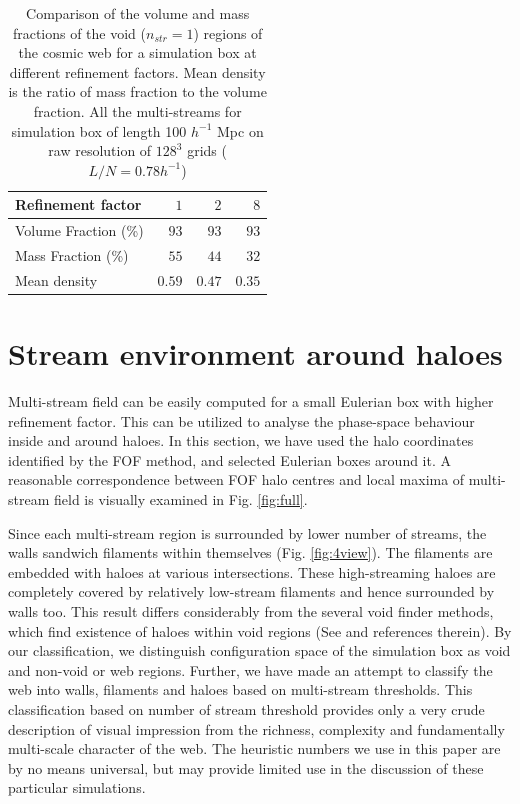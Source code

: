 \begin{table}
 \centering
  \caption{Comparison of the volume and mass fractions of the void ($n_{str} = 1$) regions of the cosmic web for a simulation box at different refinement factors. Mean density is the ratio of mass fraction to the volume fraction. All the multi-streams for simulation box of length 100 $h^{-1}$ Mpc on raw resolution of $128^{3}$ grids ($ L/N = 0.78 h^{-1}$) }
\begin{tabular}{|l|r|r|r|}
\hline
Refinement factor               & $1$ & $2$& $8$   \\ \hline
Volume Fraction (\%)                 & $93$   & $93$    & $93$       \\ \hline
Mass Fraction   (\%)               & $55$   & $44$   & $32$           \\ \hline
Mean density                    & $0.59$ & $0.47$    & $0.35$        \\ \hline
\end{tabular}

 \label{tab:Compare_ref}
\end{table}



\section{Stream environment around haloes}
\label{sec:local}

Multi-stream field can be easily computed for a small Eulerian box with higher refinement factor. This can be utilized to analyse the phase-space behaviour inside and around haloes. In this section, 
we have used the halo coordinates identified by the FOF method, and selected Eulerian boxes around it. A reasonable  correspondence between FOF halo centres and local maxima of multi-stream field is visually examined in Fig. \ref{fig:full}. 

Since each multi-stream region is surrounded by lower number of streams, the walls sandwich filaments within themselves (Fig. \ref{fig:4view}). The filaments are embedded with haloes at various intersections. These high-streaming haloes are completely covered by relatively low-stream filaments and hence surrounded by walls too. This result differs considerably from the several void finder methods, which find existence of haloes within  void regions (See \citealt{Colberg2008} and references therein). By our classification, we distinguish configuration space of the simulation box as void and non-void or web regions. Further, we have made an attempt to classify the web into walls, filaments and haloes based on multi-stream thresholds. This classification based on number of stream threshold provides only a very crude description of visual impression from the richness, complexity and fundamentally multi-scale character of the web. The heuristic numbers we use in this paper are by no means universal, but may provide limited use in the discussion of these particular simulations.

